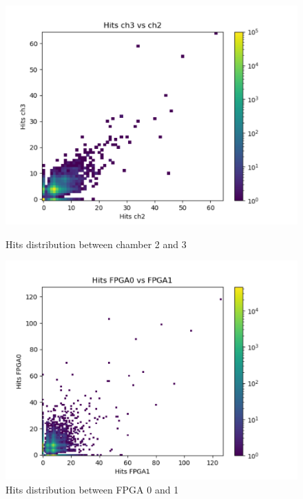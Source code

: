 \documentclass[a4paper,11pt]{book}
\begin{document}
\begin{figure}[hbtp]
\begin{minipage}[c]{0.5\textwidth}
\centering
\includegraphics[scale=0.5]{pictures/Hits_ch3_vs_ch2.pdf}
\caption{Hits distribution between chamber 2 and 3}
\label{fig:ch3_ch2}
\end{minipage}  
\begin{minipage}[c]{0.5\textwidth}
\centering
\includegraphics[scale=0.5]{pictures/Hits_FPGA0_vs_FPGA1.pdf}
\caption{Hits distribution between FPGA 0 and 1}
\label{fig:fpga0_fpga1}
\end{minipage}
\end{figure}
\end{document}
